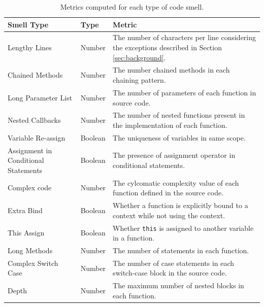\documentclass[smallcondensed]{svjour3}
\begin{document}
\begin{table}[!htbp]
\scriptsize
\centering
\caption{Metrics computed for each type of code smell.}
\label{smellmetric}
\begin{tabular}{l|l|l}
\hline
Smell Type                           & Type    & Metric                                                                                                  \\ \hline
Lengthy Lines                        & Number  & The number of characters per line considering the exceptions described in Section \ref{sec:background}. \\ \hline
Chained Methods                      & Number  & The number chained methods in each chaining pattern.                                               \\ \hline
Long Parameter List                  & Number  & The number of parameters of each function in source code.                                               \\ \hline
Nested Callbacks                     & Number  & The number of nested functions present in the implementation of each function.                          \\ \hline
Variable Re-assign                   & Boolean & The uniqueness of variables in same scope.                                                              \\ \hline
Assignment in Conditional Statements & Boolean & The presence of assignment operator in conditional statements.                                          \\ \hline
Complex code                         & Number  & The cylcomatic complexity value of each function defined in the source code.                            \\ \hline
Extra Bind                           & Boolean & Whether a function is explicitly bound to a context while not using the context.                        \\ \hline
This Assign                          & Boolean & Whether \texttt{this} is assigned to another variable in a function.                                    \\ \hline
Long Methods                         & Number  & The number of statements in each function.                                                              \\ \hline
Complex Switch Case                  & Number  & The number of case statements in each switch-case block in the source code.                             \\ \hline
Depth                                & Number  & The maximum number of nested blocks in each function.                                                   \\ \hline
\end{tabular}
\vspace{-15pt}
\end{table}
\end{document}
